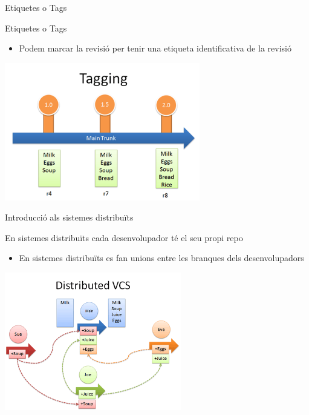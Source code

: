 \documentclass[10pt,xcolor={rgb}]{beamer}
\begin{document}
    \begin{frame}[fragile]{Etiquetes o Tags}
      
            \begin{block}{Etiquetes o Tags}
      
              \begin{itemize}
                \item Podem marcar la revisió per tenir una etiqueta identificativa de la revisió
                
              \end{itemize}

              \centering
              \includegraphics[height=6cm]{tagging.png}
      
            \end{block}
      
    \end{frame}

    \begin{frame}[fragile]{Introducció als sistemes distribuïts}
      
            \begin{block}{En sistemes distribuïts cada desenvolupador té el seu propi repo}
      
              \begin{itemize}
                \item En sistemes distribuïts es fan unions entre les branques dels desenvolupadors
                
              \end{itemize}

              \centering
              \includegraphics[height=6cm]{distributed_example.png}
      
            \end{block}
      
    \end{frame}  
\end{document}
